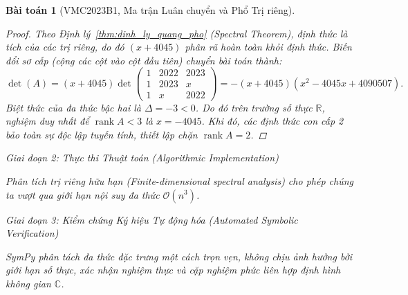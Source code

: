 \documentclass{article}
\newtheorem{baitoan}{Bài toán}
\begin{document}
\begin{baitoan}[VMC2023B1, Ma trận Luân chuyển và Phổ Trị riêng]
\begin{proof}
 Theo Định lý~\ref{thm:dinh_ly_quang_pho} (Spectral Theorem), định thức là tích của các trị riêng, do đó $(x + 4045)$ phân rã hoàn toàn khỏi định thức. Biến đổi sơ cấp (cộng các cột vào cột đầu tiên) chuyển bài toán thành:
 \begin{equation*}
 \det(A) = (x+4045) \det \begin{pmatrix} 1 & 2022 & 2023 \\ 1 & 2023 & x \\ 1 & x & 2022 \end{pmatrix} = -(x+4045)(x^2 - 4045x + 4090507).
 \end{equation*}
 Biệt thức của đa thức bậc hai là $\Delta = -3 < 0$. Do đó trên trường số thực $\mathbb{R}$, nghiệm duy nhất để $\operatorname{rank}A < 3$ là $x = -4045$. Khi đó, các định thức con cấp 2 bảo toàn sự độc lập tuyến tính, thiết lập chặn $\operatorname{rank}A = 2$.
 \end{proof}

\vspace{0.5em}\noindent\emph{Giai đoạn 2: Thực thi Thuật toán (Algorithmic Implementation)}
 
 Phân tích trị riêng hữu hạn (Finite-dimensional spectral analysis) cho phép chúng ta vượt qua giới hạn nội suy đa thức $\mathcal{O}(n^3)$. 



\vspace{0.5em}\noindent\emph{Giai đoạn 3: Kiểm chứng Ký hiệu Tự động hóa (Automated Symbolic Verification)}
 
 SymPy phân tách đa thức đặc trưng một cách trọn vẹn, không chịu ảnh hưởng bởi giới hạn số thực, xác nhận nghiệm thực và cặp nghiệm phức liên hợp định hình không gian $\mathbb{C}$.




\end{baitoan}
\end{document}
